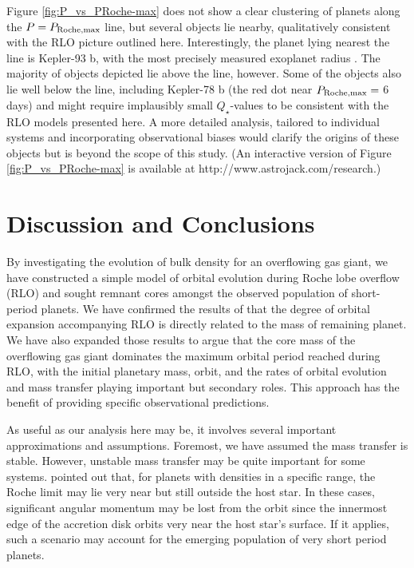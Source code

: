 \documentclass{svjour3}                     %
\begin{document}
Figure \ref{fig:P_vs_PRoche-max} does not show a clear clustering of planets along the $P = P_{\rm Roche, max}$ line, but several objects lie nearby, qualitatively consistent with the RLO picture outlined here. Interestingly, the planet lying nearest the line is Kepler-93 b, with the most precisely measured exoplanet radius \cite{2014ApJ...790...12B}. The majority of objects depicted lie above the line, however. Some of the objects also lie well below the line, including Kepler-78 b (the red dot near $P_{\rm Roche, max} =$ 6 days) and might require implausibly small $Q_\star$-values to be consistent with the RLO models presented here. A more detailed analysis, tailored to individual systems and incorporating observational biases would clarify the origins of these objects but is beyond the scope of this study. (An interactive version of Figure \ref{fig:P_vs_PRoche-max} is available at http://www.astrojack.com/research.)

\section{Discussion and Conclusions}
\label{sec:Discussion_and_Conclusions}
By investigating the evolution of bulk density for an overflowing gas giant, we have constructed a simple model of orbital evolution during Roche lobe overflow (RLO) and sought remnant cores amongst the observed population of short-period planets. We have confirmed the results of \cite{2015ApJ...813..101V} that the degree of orbital expansion accompanying RLO is directly related to the mass of remaining planet. We have also expanded those results to argue that the core mass of the overflowing gas giant dominates the maximum orbital period reached during RLO, with the initial planetary mass, orbit, and the rates of orbital evolution and mass transfer playing important but secondary roles. This approach has the benefit of providing specific observational predictions.

As useful as our analysis here may be, it involves several important approximations and assumptions. Foremost, we have assumed the mass transfer is stable. However, unstable mass transfer may be quite important for some systems. \cite{2012MNRAS.425.2778M} pointed out that, for planets with densities in a specific range, the Roche limit may lie very near but still outside the host star. In these cases, significant angular momentum may be lost from the orbit since the innermost edge of the accretion disk orbits very near the host star's surface. If it applies, such a scenario may account for the emerging population of very short period planets. 
\end{document}

